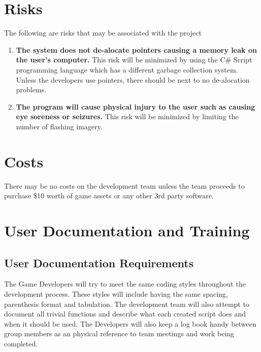 \documentclass{article}
\begin{document}
\section{Risks}
\quad The following are risks that may be associated with the project
\begin{enumerate}[{R}1. ]
	\item \textbf{The system does not de-alocate pointers causing a memory leak on the user's computer.} This risk will be minimized by using the C\# Script programming language which has a different garbage collection system. Unless the developers use pointers, there should be next to no de-alocation problems.
	\item \textbf{The program will cause physical injury to the user such as causing eye soreness or seizures.} This risk will be minimized by limiting the number of flashing imagery.
\end{enumerate}
\section{Costs}
\quad There may be no costs on the development team unless the team proceeds to purchase \$10 worth of game assets or any other 3rd party software.
\section{User Documentation and Training}
\subsection{User Documentation Requirements}
\quad The Game Developers will try to meet the same coding styles throughout the development process. These styles will include having the same spacing, parenthesis format and tabulation. The development team will also attempt to document all trivial functions and describe what each created script does and when it should be used. The Developers will also keep a log book handy between group members as an physical reference to team meetings and work being completed.
\end{document}
